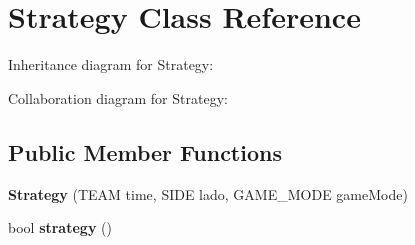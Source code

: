 \hypertarget{classStrategy}{}\section{Strategy Class Reference}
\label{classStrategy}


Inheritance diagram for Strategy\+:


Collaboration diagram for Strategy\+:
\subsection*{Public Member Functions}
\begin{DoxyCompactItemize}
\item 
{\bfseries Strategy} (T\+E\+AM time, S\+I\+DE lado, G\+A\+M\+E\+\_\+\+M\+O\+DE game\+Mode)\hypertarget{classStrategy_af90dea4384c61488c9b24bc7869cb029}{}\label{classStrategy_af90dea4384c61488c9b24bc7869cb029}

\item 
bool {\bfseries strategy} ()\hypertarget{classStrategy_a42763d8ef0496e9f3c03c1554beebe71}{}\label{classStrategy_a42763d8ef0496e9f3c03c1554beebe71}

\end{DoxyCompactItemize}
